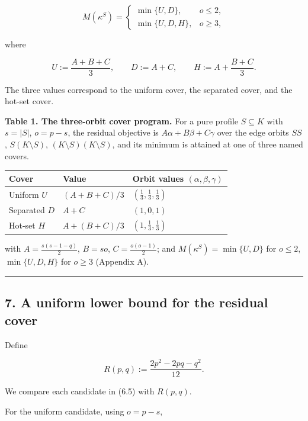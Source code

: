 \documentclass[english,11pt,a4paper]{article}
\newcounter{none}
\begin{document}
\[
M(\kappa^S)
=
\begin{cases}
\min\{U,D\},&o\le2,\\[1mm]
\min\{U,D,H\},&o\ge3,
\end{cases}
\tag{6.5}
\]

where

\[
U:=\frac{A+B+C}{3},
\qquad
D:=A+C,
\qquad
H:=A+\frac{B+C}{3}.
\tag{6.6}
\]

The three values correspond to the uniform cover, the separated cover,
and the hot-set cover.

\textbf{Table 1. The three-orbit cover program.} For a pure profile
\(S\subseteq K\) with \(s=|S|\), \(o=p-s\), the residual objective is
\(A\alpha+B\beta+C\gamma\) over the edge orbits \(SS\),
\(S(K\setminus S)\), \((K\setminus S)(K\setminus S)\), and its minimum
is attained at one of three named covers.

{\def\LTcaptype{none} %
\begin{longtable}[]{@{}lll@{}}
\toprule\noalign{}
Cover & Value & Orbit values \((\alpha,\beta,\gamma)\) \\
\midrule\noalign{}
\endhead
\bottomrule\noalign{}
\endlastfoot
Uniform \(U\) & \((A+B+C)/3\) & \((\tfrac13,\tfrac13,\tfrac13)\) \\
Separated \(D\) & \(A+C\) & \((1,0,1)\) \\
Hot-set \(H\) & \(A+(B+C)/3\) & \((1,\tfrac13,\tfrac13)\) \\
\end{longtable}
}

with \(A=\tfrac{s(s-1-q)}2\), \(B=so\), \(C=\tfrac{o(o-1)}2\); and
\(M(\kappa^S)=\min\{U,D\}\) for \(o\le2\), \(\min\{U,D,H\}\) for
\(o\ge3\) (Appendix A).

\begin{center}\rule{0.5\linewidth}{0.5pt}\end{center}

\subsection{7. A uniform lower bound for the residual
cover}\label{a-uniform-lower-bound-for-the-residual-cover}

Define

\[
R(p,q)
:=
\frac{2p^2-2pq-q^2}{12}.
\tag{7.1}
\]

We compare each candidate in (6.5) with \(R(p,q)\).

For the uniform candidate, using \(o=p-s\),
\end{document}
